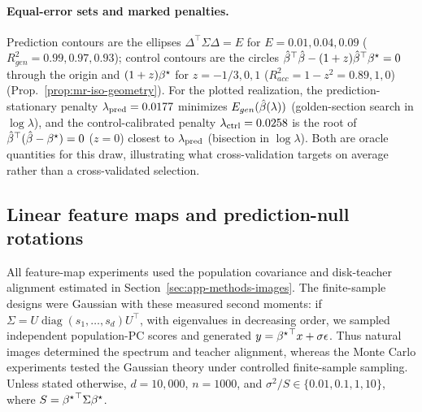 \paragraph{Equal-error sets and marked penalties.}
Prediction contours are the ellipses $\Delta^\top\Sigma\Delta=E$ for
$E=0.01,0.04,0.09$ ($R^2_{gen}=0.99,0.97,0.93$); control contours are the circles
${\hat{\beta}}^\top\hat{\beta}-(1+z){\hat{\beta}}^\top{\beta^{\star}}=0$ through the origin and
$(1+z){\beta^{\star}}$ for $z=-1/3,0,1$ ($R^2_{acc}=1-z^2=0.89,1,0$)
(Prop.~\ref{prop:mr-iso-geometry}).  For the plotted realization, the
prediction-stationary penalty $\lambda_{\rm pred}=0.0177$ minimizes
$E_{gen}(\hat{\beta}(\lambda))$ (golden-section search in $\log\lambda$), and the
control-calibrated penalty $\lambda_{\rm ctrl}=0.0258$ is the root of
${\hat{\beta}}^\top(\hat{\beta}-{\beta^{\star}})=0$ ($z=0$) closest to $\lambda_{\rm pred}$
(bisection in $\log\lambda$).  Both are oracle quantities for this draw,
illustrating what cross-validation targets on average rather than a
cross-validated selection.



\subsection{Linear feature maps and prediction-null rotations}
\label{sec:app-methods-feature}
All feature-map experiments used the population covariance and disk-teacher
alignment estimated in Section~\ref{sec:app-methods-images}.  The finite-sample
designs were Gaussian with these measured second moments: if
$\Sigma=U\operatorname{diag}(s_1,\ldots,s_d)U^\top$, with eigenvalues in
decreasing order, we sampled independent population-PC scores and generated
$y={{\beta^{\star}}}^\top x+\sigma\epsilon$.  Thus natural images determined the
spectrum and teacher alignment, whereas the Monte Carlo experiments tested
the Gaussian theory under controlled finite-sample sampling.  Unless stated
otherwise, $d=10{,}000$, $n=1000$, and
$\sigma^2/S\in\{0.01,0.1,1,10\}$, where
$S={{\beta^{\star}}}^\top\Sigma{\beta^{\star}}$.

